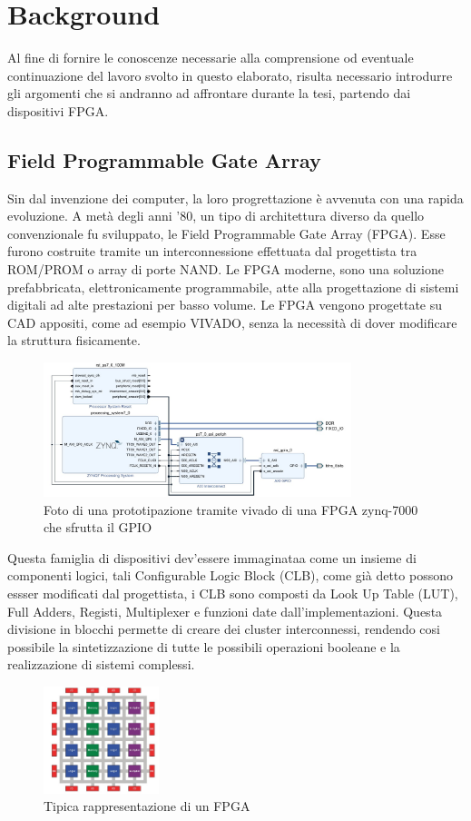 \chapter{Background}
\label{chap:background}
Al fine di fornire le conoscenze necessarie alla comprensione od eventuale continuazione del lavoro svolto in questo elaborato, risulta necessario introdurre gli argomenti che si andranno ad affrontare durante la tesi, partendo dai dispositivi FPGA.
\section{Field Programmable Gate Array}
\label{FPGA}
Sin dal invenzione dei computer, la loro progrettazione è avvenuta con una rapida evoluzione. A metà degli anni '80, un tipo di architettura diverso da quello convenzionale fu sviluppato, le Field Programmable Gate Array (FPGA). Esse furono costruite tramite un interconnessione effettuata dal progettista tra ROM/PROM o array di porte NAND.
Le FPGA moderne, sono una soluzione prefabbricata, elettronicamente programmabile, atte alla progettazione di sistemi digitali ad alte prestazioni per basso volume. Le FPGA vengono progettate su CAD appositi, come ad esempio VIVADO, senza la necessità di dover modificare la struttura fisicamente.\clearpage
\begin{figure}[h]
\centering
\includegraphics[width=0.8\textwidth]{images/Vivado.jpg}
\caption{Foto di una prototipazione tramite vivado di una FPGA zynq-7000 che sfrutta il GPIO}
\label{VIVADO1}
\end{figure}
Questa famiglia di dispositivi dev'essere immaginataa come un insieme di componenti logici, tali Configurable Logic Block (CLB), come già detto possono essser modificati dal progettista, i CLB sono composti da Look Up Table (LUT), Full Adders, Registi, Multiplexer e funzioni date dall'implementazioni.
Questa divisione in blocchi permette di creare dei cluster interconnessi, rendendo cosi possibile la sintetizzazione di tutte le possibili operazioni booleane e la realizzazione di sistemi complessi. 
\begin{figure}[h]
\centering
\includegraphics[width=0.3\textwidth]{images/FPGA.jpg}
\caption{Tipica rappresentazione di un FPGA \cite{8187326}}
\end{figure}\\
